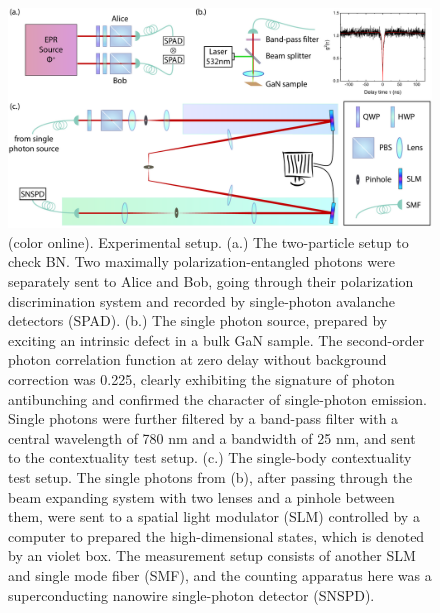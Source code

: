 \documentclass[prl,letterpaper,english,reprint,nofootinbib,aps,superscriptaddress,showpacs,showkeys]{revtex4-1}
\theoremstyle{definition}
\theoremstyle{remark}
\begin{document}
 \begin{figure}[t]
    \centering
    \includegraphics[width=160mm]{fig/exp-sch-draft-v2.pdf}
    \caption{(color online). Experimental setup.
    (a.) The two-particle setup to check BN. Two maximally polarization-entangled photons were separately sent to Alice and Bob, going through their polarization discrimination system and recorded by single-photon avalanche detectors (SPAD).
    (b.) The single photon source, prepared by exciting an intrinsic defect in a bulk GaN sample. The second-order photon correlation function at zero delay without background correction was 0.225, clearly exhibiting the signature of photon antibunching and confirmed the character of single-photon emission. Single photons were further filtered by a band-pass filter with a central wavelength of 780 nm and a bandwidth of 25 nm, and sent to the contextuality test setup.
    (c.) The single-body contextuality test setup.
    The single photons from (b), after passing through the beam expanding system with two lenses and a pinhole between them, were sent to a spatial light modulator (SLM) controlled by a computer to prepared the high-dimensional states, which is denoted by an violet box. The measurement setup consists of another SLM and single mode fiber (SMF), and the counting apparatus here was a superconducting nanowire single-photon detector (SNSPD).}
    \label{fig:exp-sch}
 \end{figure}
\end{document}
